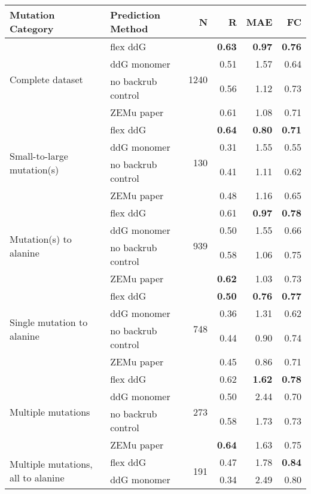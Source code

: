 \begin{table}
  \begin{tabular}{llrrrr}
\toprule
Mutation Category &   Prediction Method &     N &    R &  MAE &   FC \\
\midrule
 \multirow{ 4}{*}{Complete dataset} & flex ddG & \multirow{ 4}{*}{1240} & \textbf{0.63} & \textbf{0.97} & \textbf{0.76}  \\
 & ddG monomer & & 0.51 & 1.57 & 0.64  \\
 & no backrub control & & 0.56 & 1.12 & 0.73  \\
 & ZEMu paper & & 0.61 & 1.08 & 0.71  \\
\hline
 \multirow{ 4}{*}{Small-to-large mutation(s)} & flex ddG & \multirow{ 4}{*}{130} & \textbf{0.64} & \textbf{0.80} & \textbf{0.71}  \\
 & ddG monomer & & 0.31 & 1.55 & 0.55  \\
 & no backrub control & & 0.41 & 1.11 & 0.62  \\
 & ZEMu paper & & 0.48 & 1.16 & 0.65  \\
\hline
 \multirow{ 4}{*}{Mutation(s) to alanine} & flex ddG & \multirow{ 4}{*}{939} & 0.61 & \textbf{0.97} & \textbf{0.78}  \\
 & ddG monomer & & 0.50 & 1.55 & 0.66  \\
 & no backrub control & & 0.58 & 1.06 & 0.75  \\
 & ZEMu paper & & \textbf{0.62} & 1.03 & 0.73  \\
\hline
 \multirow{ 4}{*}{Single mutation to alanine} & flex ddG & \multirow{ 4}{*}{748} & \textbf{0.50} & \textbf{0.76} & \textbf{0.77}  \\
 & ddG monomer & & 0.36 & 1.31 & 0.62  \\
 & no backrub control & & 0.44 & 0.90 & 0.74  \\
 & ZEMu paper & & 0.45 & 0.86 & 0.71  \\
\hline
 \multirow{ 4}{*}{Multiple mutations} & flex ddG & \multirow{ 4}{*}{273} & 0.62 & \textbf{1.62} & \textbf{0.78}  \\
 & ddG monomer & & 0.50 & 2.44 & 0.70  \\
 & no backrub control & & 0.58 & 1.73 & 0.73  \\
 & ZEMu paper & & \textbf{0.64} & 1.63 & 0.75  \\
\hline
 \multirow{ 4}{*}{Multiple mutations, all to alanine} & flex ddG & \multirow{ 4}{*}{191} & 0.47 & 1.78 & \textbf{0.84}  \\
 & ddG monomer & & 0.34 & 2.49 & 0.80  \\

\end{tabular}
\end{table}
